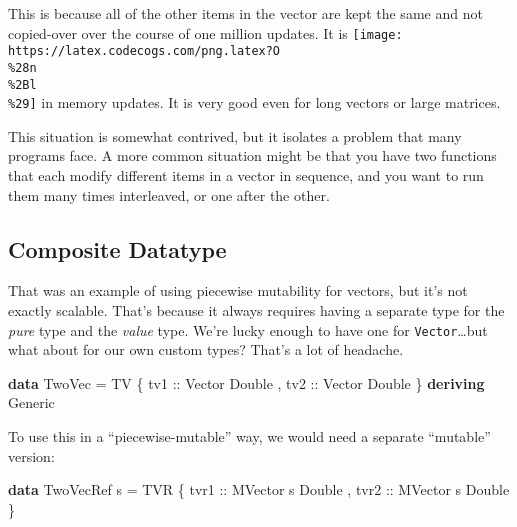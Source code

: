 \documentclass[]{article}
\newenvironment{Shaded}{}{}
\newcommand{\DataTypeTok}[1]{\textcolor[rgb]{0.56,0.13,0.00}{#1}}
\newcommand{\KeywordTok}[1]{\textcolor[rgb]{0.00,0.44,0.13}{\textbf{#1}}}
\newcommand{\NormalTok}[1]{#1}
\newcommand{\OtherTok}[1]{\textcolor[rgb]{0.00,0.44,0.13}{#1}}
\begin{document}
This is because all of the other items in the vector are kept the same and not
copied-over over the course of one million updates. It is
\texttt{[image: https://latex.codecogs.com/png.latex?O\\\%28n\\\%2Bl\\\%29]} in memory
updates. It is very good even for long vectors or large matrices.

This situation is somewhat contrived, but it isolates a problem that many
programs face. A more common situation might be that you have two functions that
each modify different items in a vector in sequence, and you want to run them
many times interleaved, or one after the other.

\hypertarget{composite-datatype}{%
\subsection{Composite Datatype}\label{composite-datatype}}

That was an example of using piecewise mutability for vectors, but it's not
exactly scalable. That's because it always requires having a separate type for
the \emph{pure} type and the \emph{value} type. We're lucky enough to have one
for \texttt{Vector}\ldots but what about for our own custom types? That's a lot
of headache.

\begin{Shaded}
\begin{Highlighting}[]
\KeywordTok{data} \DataTypeTok{TwoVec} \OtherTok{=} \DataTypeTok{TV}\NormalTok{ \{}\OtherTok{ tv1 ::} \DataTypeTok{Vector} \DataTypeTok{Double}
\NormalTok{                 ,}\OtherTok{ tv2 ::} \DataTypeTok{Vector} \DataTypeTok{Double}
\NormalTok{                 \}}
  \KeywordTok{deriving} \DataTypeTok{Generic}
\end{Highlighting}
\end{Shaded}

To use this in a ``piecewise-mutable'' way, we would need a separate ``mutable''
version:

\begin{Shaded}
\begin{Highlighting}[]
\KeywordTok{data} \DataTypeTok{TwoVecRef}\NormalTok{ s }\OtherTok{=} \DataTypeTok{TVR}\NormalTok{ \{}\OtherTok{ tvr1 ::} \DataTypeTok{MVector}\NormalTok{ s }\DataTypeTok{Double}
\NormalTok{                       ,}\OtherTok{ tvr2 ::} \DataTypeTok{MVector}\NormalTok{ s }\DataTypeTok{Double}
\NormalTok{                       \}}
\end{Highlighting}
\end{Shaded}
\end{document}
